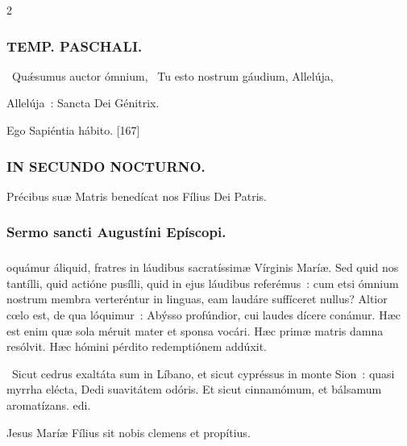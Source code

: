 \documentclass[9pt,twoside]{extarticle}
\begin{document}
\begin{multicols}{2}
\subsubsection*{\center \textsc{TEMP. PASCHALI.}}
\begin{tightlist}{}
\item {}~Quǽsumus auctor ómnium, ~Tu esto nostrum gáudium,  Allelúja,  
\item {} Allelúja~: Sancta Dei Génitrix.
\item {} Ego Sapiéntia hábito. [167]
\end{tightlist}

\subsubsection*{\center \textsc{IN SECUNDO NOCTURNO.}}
\begin{tightlist}{}
\item {\small {} Précibus suæ Matris benedícat nos Fílius Dei Patris.}
\end{tightlist}
\subsubsection*{\center Sermo sancti Augustíni Epíscopi.}
\subsubsection*{\center {}}
oquámur áliquid, fratres in láudibus sacratíssimæ Vírginis Maríæ. Sed quid nos tantílli, quid actióne pusílli, quid in ejus láudibus referémus~: cum etsi ómnium nostrum membra verteréntur in linguas, eam laudáre suffíceret nullus? Altior cœlo est, de qua lóquimur~: Abýsso profúndior, cui laudes dícere conámur. Hæc est enim quæ sola méruit mater et sponsa vocári. Hæc primæ matris damna resólvit. Hæc hómini pérdito redemptiónem addúxit.

\begin{tightlist}{}
\item {}~Sicut cedrus exaltáta sum in Líbano, et sicut cypréssus in monte Sion~: quasi myrrha elécta, \textred{*} Dedi suavitátem odóris.
 Et sicut cinnamómum, et bálsamum aromatízans. edi.
\item {\small {} Jesus Maríæ Fílius sit nobis clemens et propítius.}
\end{tightlist}


\end{multicols}
\end{document}
